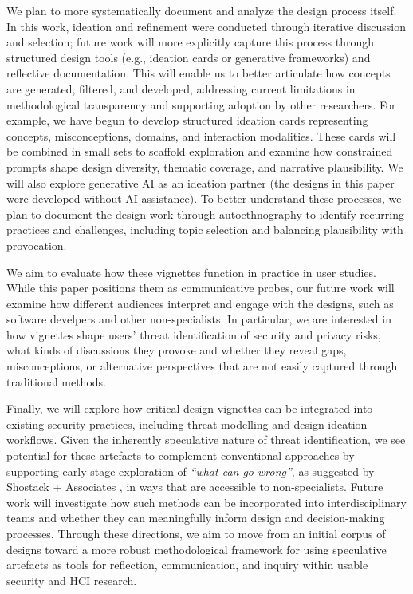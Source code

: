 We plan to more systematically document and analyze the design process itself. In this work, ideation and refinement were conducted through iterative discussion and selection; future work will more explicitly capture this process through structured design tools (e.g., ideation cards or generative frameworks) and reflective documentation. This will enable us to better articulate how concepts are generated, filtered, and developed, addressing current limitations in methodological transparency and supporting adoption by other researchers. For example, we have begun to develop structured ideation cards representing concepts, misconceptions, domains, and interaction modalities. These cards will be combined in small sets to scaffold exploration and examine how constrained prompts shape design diversity, thematic coverage, and narrative plausibility. We will also explore generative AI as an ideation partner (the designs in this paper were developed without AI assistance). To better understand these processes, we plan to document the design work through autoethnography to identify recurring practices and challenges, including topic selection and balancing plausibility with provocation. 

We aim to evaluate how these vignettes function in practice in user studies. While this paper positions them as communicative probes, our future work will examine how different audiences interpret and engage with the designs, such as software develpers and other non-specialists. In particular, we are interested in how vignettes shape users’ threat identification of security and privacy risks, what kinds of discussions they provoke and whether they reveal gaps, misconceptions, or alternative perspectives that are not easily captured through traditional methods.

Finally, we will explore how critical design vignettes can be integrated into existing security practices, including threat modelling and design ideation workflows. Given the inherently speculative nature of threat identification, we see potential for these artefacts to complement conventional approaches by supporting early-stage exploration of \textit{``what can go wrong''}, as suggested by Shostack + Associates \cite{shostack_fast_cheap_good}, in ways that are accessible to non-specialists. Future work will investigate how such methods can be incorporated into interdisciplinary teams and whether they can meaningfully inform design and decision-making processes. Through these directions, we aim to move from an initial corpus of designs toward a more robust methodological framework for using speculative artefacts as tools for reflection, communication, and inquiry within usable security and HCI research.





